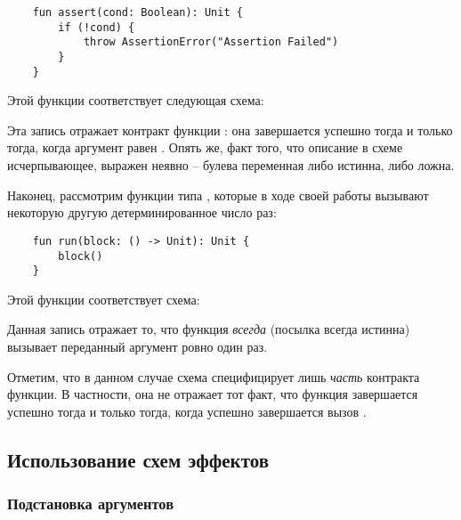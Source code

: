 \begin{verbatim}
    fun assert(cond: Boolean): Unit {
        if (!cond) {
            throw AssertionError("Assertion Failed")
        }
    }
\end{verbatim}

Этой функции соответствует следующая схема:

{}

Эта запись отражает контракт функции : она завершается успешно тогда и только тогда, когда аргумент равен . Опять же, факт того, что описание в схеме исчерпывающее, выражен неявно -- булева переменная либо истинна, либо ложна.


\bigskip


Наконец, рассмотрим функции типа , которые в ходе своей работы вызывают некоторую другую детерминированное число раз:

\begin{verbatim}
    fun run(block: () -> Unit): Unit {
        block()
    }
\end{verbatim}

Этой функции соответствует схема:

{}

Данная запись отражает то, что функция  \emph{всегда} (посылка  всегда истинна) вызывает переданный аргумент  ровно один раз.

Отметим, что в данном случае схема специфицирует лишь \emph{часть} контракта функции. В частности, она не отражает тот факт, что функция завершается успешно тогда и только тогда, когда успешно завершается вызов .








\subsection{Использование схем эффектов}

\subsubsection{Подстановка аргументов}

